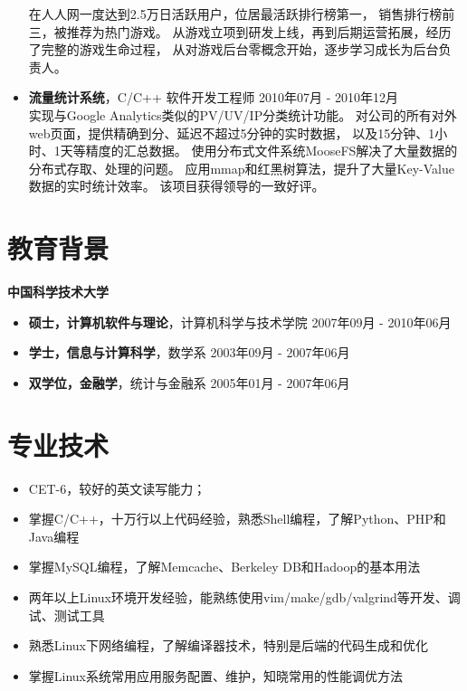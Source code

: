 \documentclass[margin]{res}
\newcommand{\ustc}{中国科学技术大学}
\begin{document}
\begin{itemize}
        在人人网一度达到2.5万日活跃用户，位居最活跃排行榜第一，
        销售排行榜前三，被推荐为热门游戏。
        从游戏立项到研发上线，再到后期运营拓展，经历了完整的游戏生命过程，
        从对游戏后台零概念开始，逐步学习成长为后台负责人。
        \\
   \item {\bf 流量统计系统}，C/C++ 软件开发工程师 
       \hfill 2010年07月 - 2010年12月\\[1mm]
       实现与Google Analytics类似的PV/UV/IP分类统计功能。
       对公司的所有对外web页面，提供精确到分、延迟不超过5分钟的实时数据，
       以及15分钟、1小时、1天等精度的汇总数据。
       使用分布式文件系统MooseFS解决了大量数据的分布式存取、处理的问题。
       应用mmap和红黑树算法，提升了大量Key-Value数据的实时统计效率。
       该项目获得领导的一致好评。



\end{itemize}

\section{\Large 教育背景}
{\bf \large \ustc}\\[1mm]
\begin{itemize}
    \item {\bf 硕士，计算机软件与理论}，计算机科学与技术学院 \hfill 2007年09月 - 2010年06月
    \item {\bf 学士，信息与计算科学}，数学系 \hfill 2003年09月 - 2007年06月
    \item {\bf 双学位，金融学}，统计与金融系 \hfill 2005年01月 - 2007年06月
\end{itemize}


\section{\Large 专业技术}
\begin{itemize}
    \item CET-6，较好的英文读写能力；
    \item 掌握C/C++，十万行以上代码经验，熟悉Shell编程，了解Python、PHP和Java编程
    \item 掌握MySQL编程，了解Memcache、Berkeley DB和Hadoop的基本用法
    \item 两年以上Linux环境开发经验，能熟练使用vim/make/gdb/valgrind等开发、调试、测试工具
    \item 熟悉Linux下网络编程，了解编译器技术，特别是后端的代码生成和优化
    \item 掌握Linux系统常用应用服务配置、维护，知晓常用的性能调优方法
\end{itemize}
\end{document}
